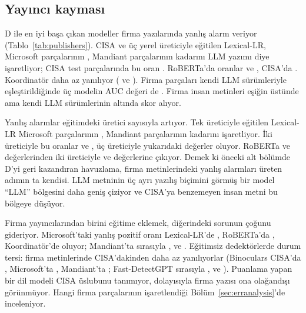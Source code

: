 \documentclass[journal]{IEEEtran}
\begin{document}

\subsection{Yayıncı kayması}
D ile en iyi başa çıkan modeller firma yazılarında yanlış alarm veriyor (Tablo~\ref{tab:publishers}). CISA ve üç
yerel üreticiyle eğitilen Lexical-LR, Microsoft parçalarının \PubMicrosoftLexlrFpr{}, Mandiant parçalarının
\PubMandiantLexlrFpr{} kadarını LLM yazımı diye işaretliyor; CISA test parçalarında bu oran \PubCisaLexlrFpr{}.
RoBERTa'da oranlar \PubMicrosoftTransFpr{} ve \PubMandiantTransFpr{}, CISA'da \PubCisaTransFpr{}. Koordinatör daha
az yanılıyor (\PubMicrosoftCoordFpr{} ve \PubMandiantCoordFpr{}). Firma parçaları kendi LLM sürümleriyle
eşleştirildiğinde üç modelin AUC değeri de \PubMicrosoftTransAuc{}. Firma insan metinleri eşiğin üstünde ama kendi
LLM sürümlerinin altında skor alıyor.

Yanlış alarmlar eğitimdeki üretici sayısıyla artıyor. Tek üreticiyle eğitilen Lexical-LR Microsoft parçalarının
\PoolfprOneMicrosoftLexlr{}, Mandiant parçalarının \PoolfprOneMandiantLexlr{} kadarını işaretliyor. İki üreticiyle
bu oranlar \PoolfprTwoMicrosoftLexlr{} ve \PoolfprTwoMandiantLexlr{}, üç üreticiyle yukarıdaki değerler oluyor.
RoBERTa \PoolfprOneMicrosoftTrans{} ve \PoolfprOneMandiantTrans{} değerlerinden iki üreticiyle
\PoolfprTwoMicrosoftTrans{} ve \PoolfprTwoMandiantTrans{} değerlerine çıkıyor. Demek ki önceki alt bölümde D'yi
geri kazandıran havuzlama, firma metinlerindeki yanlış alarmları üreten adımın ta kendisi. LLM metninin üç ayrı
yazılış biçimini görmüş bir model ``LLM'' bölgesini daha geniş çiziyor ve CISA'ya benzemeyen insan metni bu
bölgeye düşüyor.

Firma yayıncılarından birini eğitime eklemek, diğerindeki sorunun çoğunu gideriyor. Microsoft'taki yanlış pozitif
oranı Lexical-LR'de \PubMicrosoftLexlrFprAug{}, RoBERTa'da \PubMicrosoftTransFprAug{}, Koordinatör'de
\PubMicrosoftCoordFprAug{} oluyor; Mandiant'ta sırasıyla \PubMandiantLexlrFprAug{}, \PubMandiantTransFprAug{} ve
\PubMandiantCoordFprAug{}. Eğitimsiz dedektörlerde durum tersi: firma metinlerinde CISA'dakinden daha az
yanılıyorlar (Binoculars CISA'da \PubCisaBinoFpr{}, Microsoft'ta \PubMicrosoftBinoFpr{}, Mandiant'ta
\PubMandiantBinoFpr{}; Fast-DetectGPT sırasıyla \PubCisaFastFpr{}, \PubMicrosoftFastFpr{} ve
\PubMandiantFastFpr{}). Puanlama yapan bir dil modeli CISA üslubunu tanımıyor, dolayısıyla firma yazısı ona
olağandışı görünmüyor. Hangi firma parçalarının işaretlendiği Bölüm~\ref{sec:erranalysis}'de inceleniyor.
\end{document}
